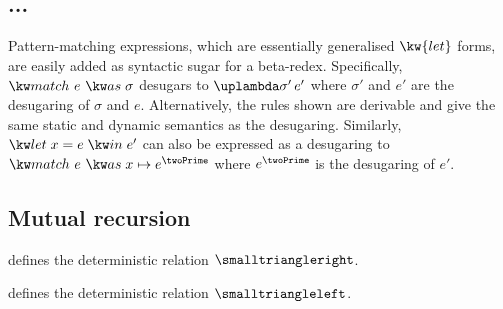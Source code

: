 


% 






% 
% 
% 
% 
% 

% 

\subsection{...}
\label{sec:impl-language:match-as}

Pattern-matching expressions, which are essentially generalised $\kw{let}$
forms, are easily added as syntactic sugar for a beta-redex. Specifically,
$\exMatch{e}{\sigma}$ desugars to $\exApp{\exFun{\sigma'}}{e'}$ where $\sigma'$
and $e'$ are the desugaring of $\sigma$ and $e$. Alternatively, the rules shown
are derivable and give the same static and dynamic semantics as the desugaring.
Similarly, $\exLet{x}{e}{e'}$ can also be expressed as a desugaring to
$\exMatch{e}{\trieVar{x}{e^\twoPrime}}$ where $e^\twoPrime$ is the desugaring of
$e'$.

\subsection{Mutual recursion}
\label{sec:impl-language:recursion}



\begin{definition}
\label{def:closedefs}
    defines the deterministic relation $\closeDefs$.
\end{definition}

\begin{definition}
\label{def:unclosedefs}
    defines the deterministic relation $\uncloseDefs$.
\end{definition}

